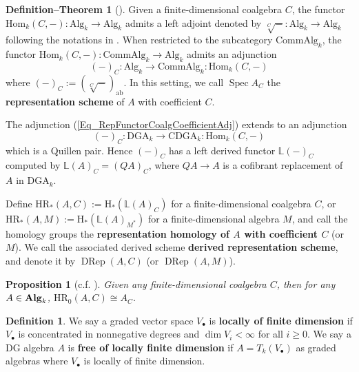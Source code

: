 \documentclass{article}
\numberwithin{equation}{section} %
\theoremstyle{plain}
\newtheorem{proposition}[theorem]{Proposition}
\theoremstyle{definition}
\newtheorem*{de}{Definition--Theorem}
\newtheorem{definition}[theorem]{Definition}
\theoremstyle{remark}
\begin{document}
\begin{de}[{\cite[Section A.1]{BFPRW17}}]
Given a finite-dimensional coalgebra $C$, the functor $\mathrm{Hom}_k(C,-):\bm{\mathrm{Alg}}_k\to\bm{\mathrm{Alg}}_k$ admits a left adjoint denoted by $\sqrt[C]{-}:\bm{\mathrm{Alg}}_k\to\bm{\mathrm{Alg}}_k$ following the notations in \cite{BKR13}.
When restricted to the subcategory $\bm{\mathrm{CommAlg}}_k$, the functor $\mathrm{Hom}_k(C,-):\bm{\mathrm{CommAlg}}_k\to\bm{\mathrm{Alg}}_k$ admits an adjunction
\begin{equation}\label{Eq_RepFunctorCoalgCoefficientAdj}
(-)_C:\bm{\mathrm{Alg}}_k\to\bm{\mathrm{CommAlg}}_k:\mathrm{Hom}_k(C,-)
\end{equation}
where $(-)_C:=(\sqrt[C]{-})_{\mathrm{ab}}$.
In this setting, we call $\operatorname{Spec}A_C$ the \textbf{representation scheme} of $A$ with coefficient $C$.

The adjunction (\ref{Eq_RepFunctorCoalgCoefficientAdj}) extends to an adjunction
\begin{equation*}
(-)_C:\bm{\mathrm{DGA}}_k\to\bm{\mathrm{CDGA}}_k:\mathrm{Hom}_k(C,-)
\end{equation*}
which is a Quillen pair.
Hence $(-)_C$ has a left derived functor $\mathbb{L}(-)_C$ computed by $\mathbb{L}(A)_C=(QA)_C$, where $QA\to A$ is a cofibrant replacement of $A$ in $\bm{\mathrm{DGA}}_k$.

Define $\mathrm{HR}_*(A,C):=\mathrm{H}_*(\mathbb{L}(A)_C)$ for a finite-dimensional coalgebra $C$, or $\mathrm{HR}_*(A,M):=\mathrm{H}_*(\mathbb{L}(A)_{M^*})$ for a finite-dimensional algebra $M$, and call the homology groups the \textbf{representation homology of $A$ with coefficient $C$} (or $M$).
We call the associated derived scheme \textbf{derived representation scheme}, and denote it by $\operatorname{DRep}(A,C)$ (or $\operatorname{DRep}(A,M)$).
\end{de}

\begin{proposition}[c.f. {\cite[Theorem 2.5]{BKR13}}]\label{Proposition_ZeroTrunction}
Given any finite-dimensional coalgebra $C$, then for any $A\in{\bf Alg}_k$, $\mathrm{HR}_0(A,C)\cong A_C$.
\end{proposition}

\begin{definition}\label{Def_LocallyFinite}
We say a graded vector space $V_\bullet$ is \textbf{locally of finite dimension} if $V_\bullet$ is concentrated in nonnegative degrees and $\dim V_i<\infty$ for all $i\geq0$.
We say a DG algebra $A$ is \textbf{free of locally finite dimension} if $A=T_k(V_\bullet)$ as graded algebras where $V_\bullet$ is locally of finite dimension.
\end{definition}
\end{document}
